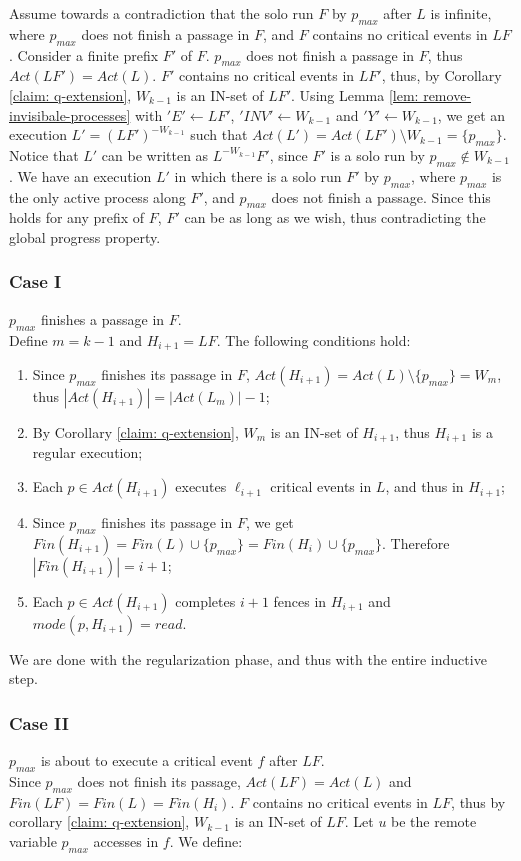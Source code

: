 Assume towards a contradiction that the solo run $F$ by $p_{max}$ after $L$ is infinite, where $p_{max}$ does not finish a passage in $F$, and $F$ contains no critical events in $L F$. Consider a finite prefix $F'$ of $F$. $p_{max}$ does not finish a passage in $F$, thus $Act(L F') = Act(L)$. $F'$ contains no critical events in $L F'$, thus, by Corollary \ref{claim: q-extension}, $W_{k-1}$ is an IN-set of $L F'$. Using Lemma \ref{lem: remove-invisibale-processes} with $'E' \leftarrow L F'$, $'INV' \leftarrow W_{k-1}$ and $'Y' \leftarrow W_{k-1}$, we get an execution $L' = (L F')^{-W_{k-1}}$ such that $Act(L') = Act(L F') \setminus W_{k-1} = \{p_{max}\}$. Notice that $L'$ can be written as $L^{-W_{k-1}} F'$, since $F'$ is a solo run by $p_{max} \notin W_{k-1}$. We have an execution $L'$ in which there is a solo run $F'$ by $p_{max}$, where $p_{max}$ is the only active process along $F'$, and $p_{max}$ does not finish a passage. Since this holds for any prefix of $F$, $F'$ can be as long as we wish, thus contradicting the global progress property.

\subsubsection*{\hspace{5mm} Case I}
$p_{max}$ finishes a passage in $F$.
\\ Define $m = k-1$ and $H_{i+1} = L F$. The following conditions hold:
\begin{enumerate}
	\item Since $p_{max}$ finishes its passage in $F$, $Act(H_{i+1}) = Act(L) \setminus \{p_{max}\} = W_m$, thus $|Act(H_{i+1})| = |Act(L_m)|-1$;
	\item By Corollary \ref{claim: q-extension}, $W_m$ is an IN-set of $H_{i+1}$, thus $H_{i+1}$ is a regular execution;
	\item Each $p \in Act(H_{i+1})$ executes $\ell_{i+1}$ critical events in $L$, and thus in $H_{i+1}$;
	\item Since $p_{max}$ finishes its passage in $F$, we get $Fin(H_{i+1}) = Fin(L) \cup \{p_{max}\} = Fin(H_i) \cup \{p_{max}\}$. Therefore $|Fin(H_{i+1})| = i+1$;
	\item Each $p \in Act(H_{i+1})$ completes $i+1$ fences in $H_{i+1}$ and $mode(p,H_{i+1}) = read$.
\end{enumerate}
We are done with the regularization phase, and thus with the entire inductive step.

\subsubsection*{\hspace{5mm} Case II}
$p_{max}$ is about to execute a critical event $f$ after $L F$.
\\ Since $p_{max}$ does not finish its passage, $Act(L F) = Act(L)$ and $Fin(L F) = Fin(L) = Fin(H_i)$. $F$ contains no critical events in $L F$, thus by corollary \ref{claim: q-extension}, $W_{k-1}$ is an IN-set of $L F$. Let $u$ be the remote variable $p_{max}$ accesses in $f$. We define:

